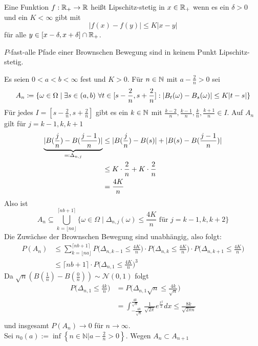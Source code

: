 \documentclass[a4paper,twoside,DIV15,BCOR12mm]{scrbook}
\begin{document}
\begin{definition}
Eine Funktion $f:\mathbb{R}_{+}\to \mathbb{R}$ heißt Lipschitz-stetig in $x\in\mathbb{R}_+$ wenn es ein $\delta>0$ und ein $K<\infty$ gibt mit
\[ |f(x)-f(y)| \le K|x-y|\]
für alle $y\in[x-\delta,x+\delta]\cap\mathbb{R}_+$.
\end{definition}

\begin{satz}
\label{satz:11.2}
$P$-fast-alle Pfade einer Brownschen Bewegung sind in keinem Punkt Lipschitz-stetig.
\end{satz}
\begin{beweis}
Es seien $0<a<b<\infty$ fest und $K>0$. Für $n\in\mathbb{N}$ mit $a-\frac 2n>0$ sei 
\[
A_n \da \{\omega\in \Omega\mid \exists s\in (a,b)\ \forall t\in[s-\frac2n,s+\frac2n]: |B_t(\omega) - B_s(\omega)| \le K|t-s|\}
\]
Für jedes $I=[s-\frac2n,s+\frac2n]$ gibt es ein $k\in\mathbb{N}$ mit $\frac{k-2}n,\frac{k-1}n,\frac kn,\frac{k+1}n\in I$. Auf $A_n$ gilt für $j=k-1,k,k+1$
\begin{align*}
\underbrace{|B(\frac jn)-B(\frac {j-1}n)|}_{\ad \Delta_{n,j}} &\le | B(\frac jn) - B(s)| + |B(s) - B(\frac {j-1}n)| \\
&\le K\cdot \frac 2n + K\cdot \frac 2n\\
&= \frac{4K}n
\end{align*}
Also ist 
\[
A_n\subseteq \bigcup_{k=\lfloor na\rfloor}^{\lceil nb+1\rceil} \{\omega\in \Omega\mid \Delta_{n,j}(\omega) \le \frac{4K}n\text{ für }j=k-1,k,k+2\}
\]
Die Zuwächse der Brownschen Bewegung sind unabhängig, also folgt:
\begin{align*}
P(A_n) &\le \sum_{k=\lfloor na\rfloor}^{\lceil nb+1\rceil} P\Big(\Delta_{n,k-1}\le \frac{4K}n\Big)\cdot P\Big(\Delta_{n,k}\le \frac{4K}n\Big)\cdot P\Big(\Delta_{n,k+1}\le \frac{4K}n\Big) \\
&\le {\lceil nb+1\rceil}\cdot P\Big(\Delta_{n,1}\le \frac{4K}n\Big)^3
\end{align*}
Da $\sqrt{n}(B(\frac{1}{n})-B(\frac{0}{n}))\sim\mathcal N(0,1)$ folgt
\begin{align*}
  P\Big(\Delta_{n,1}\leq\frac{4k}{n}\Big) &=P\Big(\Delta_{n,1}\sqrt{n}\leq\frac{4k}{\sqrt{n}}\Big) \\
  &=\int_{-\frac{4k}{\sqrt{n}}}^{\frac{4k}{\sqrt{n}}}\frac{1}{\sqrt{2\pi}}e^{\frac{x^2}{2}}dx\leq\frac{8k}{\sqrt{2\pi n}} \\
\end{align*}
und insgesamt $P(A_n)\longrightarrow 0$ für $n\longrightarrow\infty$. \\
Sei $n_0(a):=\inf\left\{n\in\mathbb N\vert a-\frac{2}{n} > 0\right\}$. Wegen $A_n\subset A_{n+1}$

\end{beweis}
\end{document}
